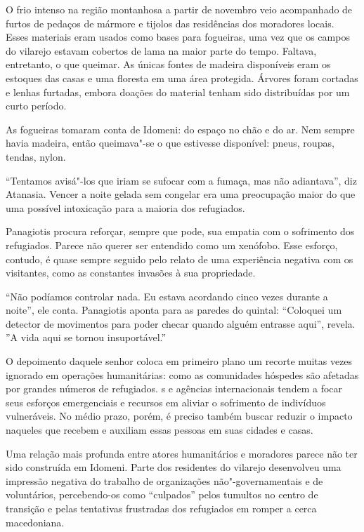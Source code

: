 O frio intenso na região montanhosa a partir de novembro veio
acompanhado de furtos de pedaços de mármore e tijolos das residências
dos moradores locais. Esses materiais eram usados como bases para
fogueiras, uma vez que os campos do vilarejo estavam cobertos de lama na
maior parte do tempo. Faltava, entretanto, o que queimar. As únicas
fontes de madeira disponíveis eram os estoques das casas e uma floresta
em uma área protegida. Árvores foram cortadas e lenhas furtadas, embora
doações do material tenham sido distribuídas por um curto período.

As fogueiras tomaram conta de Idomeni: do espaço no chão e do ar. Nem
sempre havia madeira, então queimava"-se o que estivesse disponível:
pneus, roupas, tendas, nylon.

``Tentamos avisá"-los que iriam se sufocar com a fumaça, mas não
adiantava'', diz Atanasia. Vencer a noite gelada sem congelar 
era uma preocupação maior do que uma possível intoxicação
para a maioria dos refugiados.

Panagiotis procura reforçar, sempre que pode, sua empatia com o
sofrimento dos refugiados. Parece não querer ser entendido como um
xenófobo. Esse esforço, contudo, é quase sempre seguido pelo relato de
uma experiência negativa com os visitantes, como as constantes invasões
à sua propriedade.

``Não podíamos controlar nada. Eu estava acordando cinco vezes durante a
noite'', ele conta. Panagiotis aponta para as paredes do quintal:
``Coloquei um detector de movimentos para poder checar quando alguém
entrasse aqui'', revela. ''A vida aqui se tornou insuportável.''

O depoimento daquele senhor coloca em primeiro plano um recorte muitas
vezes ignorado em operações humanitárias: como as comunidades hóspedes
são afetadas por grandes números de refugiados. s e agências
internacionais tendem a focar seus esforços emergenciais e recursos em
aliviar o sofrimento de indivíduos vulneráveis. No médio prazo, porém, é
preciso também buscar reduzir o impacto naqueles que recebem e auxiliam
essas pessoas em suas cidades e casas.

Uma relação mais profunda entre atores humanitários e moradores parece
não ter sido construída em Idomeni. Parte dos residentes do vilarejo
desenvolveu uma impressão negativa do trabalho de organizações
não"-governamentais e de voluntários, percebendo-os como ``culpados''
pelos tumultos no centro de transição e pelas tentativas frustradas dos
refugiados em romper a cerca macedoniana.

